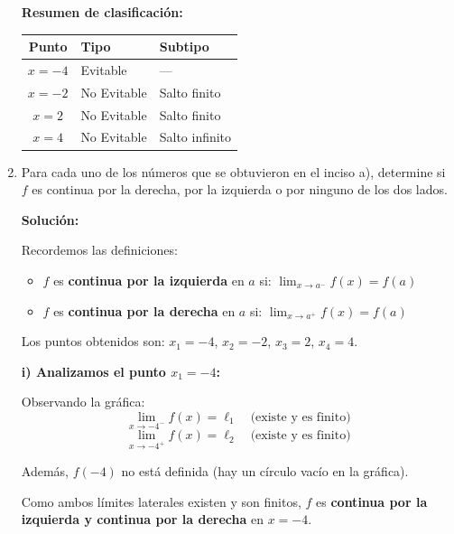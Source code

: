 \documentclass[12pt]{article}
\newcommand{\solucion}{%
    \vspace{0.8em}%
    \textbf{Solución:}%
}
\begin{document}
\begin{enumerate}[label=\alph*.-]
    \vspace{0.5em}
    \textbf{Resumen de clasificación:}
 
    \begin{center}
    \begin{tabular}{cll}
        \toprule
        Punto & Tipo & Subtipo \\
        \midrule
        $x = -4$ & Evitable & --- \\
        $x = -2$ & No Evitable & Salto finito \\
        $x = 2$  & No Evitable & Salto finito \\
        $x = 4$  & No Evitable & Salto infinito \\
        \bottomrule
    \end{tabular}
    \end{center}
 
    \newpage
    \item Para cada uno de los números que se obtuvieron en el inciso a), determine si $f$ es continua por la derecha, por la izquierda o por ninguno de los dos lados.
 
    \solucion
 
    Recordemos las definiciones:
    \begin{itemize}[leftmargin=2em]
        \item $f$ es \textbf{continua por la izquierda} en $a$ si: $\displaystyle\lim_{x \to a^-} f(x) = f(a)$
        \item $f$ es \textbf{continua por la derecha} en $a$ si: $\displaystyle\lim_{x \to a^+} f(x) = f(a)$
    \end{itemize}
 
    Los puntos obtenidos son: $x_1 = -4$, $x_2 = -2$, $x_3 = 2$, $x_4 = 4$.
 
    \vspace{0.5em}
    \textbf{i) Analizamos el punto $x_1 = -4$:}
 
    Observando la gráfica:
    \[
    \lim_{x \to -4^-} f(x) = \ell_1 \quad \text{(existe y es finito)}
    \]
    \[
    \lim_{x \to -4^+} f(x) = \ell_2 \quad \text{(existe y es finito} \text{)}
    \]
    
    Además, $f(-4)$ no está definida (hay un círculo vacío en la gráfica).
    
    Como ambos límites laterales existen y son finitos, $f$ es \textbf{continua por la izquierda y continua por la derecha} en $x = -4$.
    

\end{enumerate}
\end{document}
